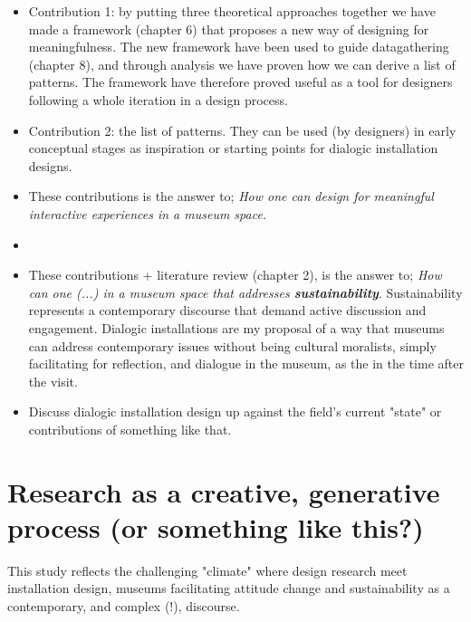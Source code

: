 \begin{itemize}
    \item Contribution 1: by putting three theoretical approaches together we have made a framework (chapter 6) that proposes a new way of designing for meaningfulness. The new framework have been used to guide datagathering (chapter 8), and through analysis we have proven how we can derive a list of patterns. The framework have therefore proved useful as a tool for designers following a whole iteration in a design process.
    
    
    \item Contribution 2: the list of patterns. They can be used (by designers) in early conceptual stages as inspiration or starting points for dialogic installation designs. 
    \item These contributions is the answer to; \emph{How one can design for meaningful interactive experiences in a museum space.}
    \item
    
     \item These contributions + literature review (chapter 2), is the answer to; \emph{How can one (...) in a museum space that addresses \textbf{sustainability}}. Sustainability represents a contemporary discourse that demand active discussion and engagement. Dialogic installations are my proposal of a way that museums can address contemporary issues without being cultural moralists, simply facilitating for reflection, and dialogue in the museum, as the  in the time after the visit. 
    \item Discuss dialogic installation design up against the field's current "state" or contributions of something like that.

\end{itemize}


\section{Research as a creative, generative process (or something like this?)}
This study reflects the challenging "climate" where design research meet installation design, museums facilitating attitude change and sustainability as a contemporary, and complex (!), discourse.

